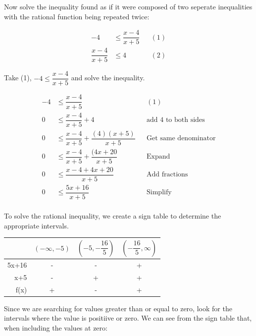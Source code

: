 \documentclass[12pt]{book}
\begin{document}
\begin{enumerate}
Now solve the inequality found as if it were composed of two seperate inequalities with the rational function being repeated twice:

\begin{align*}
    -4 &\le \dfrac{x-4}{x+5} && (1)\\
    \dfrac{x-4}{x+5} &\le 4 && (2)
\end{align*}

\vspace{1cm}

Take (1), $-4 \le \dfrac{x-4}{x+5}$ and solve the inequality.

\begin{align*}
    -4 &\le \dfrac{x-4}{x+5} && (1)\\
    0 &\le \dfrac{x-4}{x+5} + 4 && \text{add 4 to both sides} \\
    0 &\le \dfrac{x-4}{x+5} + \dfrac{(4)(x+5)}{x+5} && \text{Get same denominator} \\
    0 &\le \dfrac{x-4}{x+5} + \dfrac{(4x+20}{x+5} && \text{Expand} \\
    0 &\le \dfrac{x-4+4x+20}{x+5} && \text{Add fractions} \\
    0 &\le \dfrac{5x+16}{x+5} && \text{Simplify} \\
\end{align*}

\newpage

\begin{center}
To solve the rational inequality, we create a sign table
 to determine the appropriate intervals.
\end{center}
\vspace{0.5cm}

\begin{center}
    \begin{tabular}{|r|c|c|c|}
        \hline
        & $(-\infty, -5)$ & $\left(-5, -\dfrac{16}{5} \right)$ & $\left( -\dfrac{16}{5}, \infty \right)$ \\ \hline
        5x+16 & - & - & + \\ \hline
        x+5 & - & + & + \\ \hline
        f(x) & + & - & + \\ \hline
    \end{tabular}
\end{center}

\vspace{0.3cm}

Since we are searching for values greater than or equal to zero,
 look for the intervals where the value is positiive or zero. We can see
  from the sign table that, when including the values at zero:


\end{enumerate}
\end{document}
